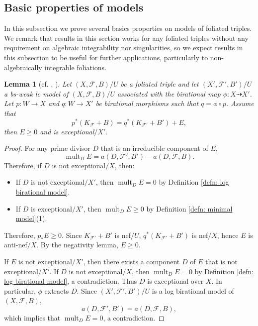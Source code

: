 \documentclass[11pt]{amsart}
\numberwithin{equation}{section}
\newcommand{\mult}{\operatorname{mult}}
\newcommand{\Ff}{\mathcal{F}}
\newtheorem{lem}[thm]{Lemma}
\theoremstyle{definition}
\theoremstyle{definition}
\theoremstyle{definition}
\begin{document}
\subsection{Basic properties of models}

In this subsection we prove several basics properties on models of foliated triples. We remark that results in this section works for any foliated triples without any requirement on algebraic integrability nor singularities, so we expect results in this subsection to be useful for further applications, particularly to non-algebraically integrable foliations.


\begin{lem}[cf.{ \cite[Remark 2.6]{Bir12}, \cite[Lemma 3.4]{HL23}}]\label{lem: hl23 2.6}
Let $(X,\Ff,B)/U$ be a foliated triple and let $(X',\Ff',B')/U$ a bs-weak lc model of $(X,\Ff,B)/U$ associated with the birational map $\phi: X\dashrightarrow X'$. Let $p: W\rightarrow X$ and $q: W\rightarrow X'$ be birational morphisms such that $q=\phi\circ p$. Assume that
$$p^*(K_\Ff+B)=q^*(K_{\Ff'}+B')+E,$$
then $E\geq 0$ and is exceptional$/X'$.
\end{lem}
\begin{proof}
For any prime divisor $D$ that is an irreducible component of $E$, $$\mult_DE=a(D,\Ff',B')-a(D,\Ff,B).$$ 
Therefore, if $D$ is not exceptional$/X$, then:
\begin{itemize}
    \item If $D$ is not exceptional$/X'$, then $\mult_DE=0$ by Definition \ref{defn: log birational model}.
    \item If $D$ is exceptional$/X'$, then $\mult_DE\geq 0$ by Definition \ref{defn: minimal model}(1).
\end{itemize}
Therefore, $p_*E\geq 0$. Since $K_{\Ff'}+B'$ is nef$/U$, $q^*(K_{\Ff'}+B')$ is nef$/X$, hence $E$ is anti-nef$/X$. By the negativity lemma, $E\geq 0$.

If $E$ is not exceptional$/X'$, then there exists a component $D$ of $E$ that is not exceptional$/X'$. If $D$ is not exceptional$/X$, then $\mult_DE=0$ by Definition \ref{defn: log birational model}, a contradiction. Thus $D$ is exceptional over $X$. In particular, $\phi$ extracts $D$. Since $(X',\Ff',B')/U$ is a log birational model of $(X,\Ff,B)$, $$a(D,\Ff',B')=a(D,\Ff,B),$$ 
which implies that $\mult_DE=0$, a contradiction.
\end{proof}
\end{document}
